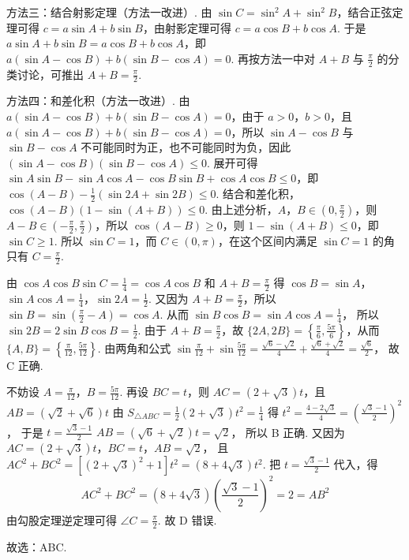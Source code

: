\begin{solution}
方法三：结合射影定理（方法一改进）. 由 \(\sin C = \sin^2 A + \sin^2 B\)，结合正弦定理可得 \(c = a \sin A + b \sin B\)，由射影定理可得 \(c = a \cos B + b \cos A\). 于是 \(a \sin A + b \sin B = a \cos B + b \cos A\)，即 \(a(\sin A - \cos B) + b(\sin B - \cos A) = 0\). 再按方法一中对 \(A+B\) 与 \(\frac{\pi}{2}\) 的分类讨论，可推出 \(A + B = \frac{\pi}{2}\).

方法四：和差化积（方法一改进）. 由 \(a(\sin A - \cos B) + b(\sin B - \cos A) = 0\)，由于 \(a>0\)，\(b>0\)，且 \(a(\sin A-\cos B)+b(\sin B-\cos A)=0\)，所以 \(\sin A-\cos B\) 与 \(\sin B-\cos A\) 不可能同时为正，也不可能同时为负，因此 \((\sin A - \cos B)(\sin B - \cos A) \le 0\). 展开可得 \(\sin A \sin B - \sin A \cos A - \cos B \sin B + \cos A \cos B \le 0\)，即 \(\cos (A - B) - \frac{1}{2}(\sin 2A + \sin 2B) \le 0\). 结合和差化积，\(\cos (A - B)(1 - \sin (A + B)) \le 0\). 由上述分析，\(A\)，\(B \in \left(0,\frac{\pi}{2}\right)\)，则 \(A - B \in (-\frac{\pi}{2},\frac{\pi}{2})\)，所以 \(\cos (A - B) \ge 0\)，则 \(1 - \sin (A + B) \le 0\)，即 \(\sin C \ge 1\). 所以 \(\sin C = 1\)，而 \(C\in(0,\pi)\)，在这个区间内满足 \(\sin C=1\) 的角只有 \(C=\frac{\pi}{2}\).

由
\(\cos A \cos B \sin C = \frac{1}{4} = \cos A \cos B\)
和
\(A + B = \frac{\pi}{2}\)
得
\(\cos B=\sin A\)，\(\sin A \cos A=\frac{1}{4}\)，\(\sin 2A=\frac{1}{2}\).
又因为 \(A+B=\frac{\pi}{2}\)，所以
\(\sin B=\sin\left(\frac{\pi}{2}-A\right)=\cos A\).
从而
\(\sin B\cos B=\sin A\cos A=\frac{1}{4}\)，
所以
\(\sin 2B=2\sin B\cos B=\frac{1}{2}\).
由于 \(A+B=\frac{\pi}{2}\)，故
\(\{2A,2B\}=\left\{\frac{\pi}{6},\frac{5\pi}{6}\right\}\)，从而
\(\{A,B\}=\left\{\frac{\pi}{12},\frac{5\pi}{12}\right\}\).
由两角和公式
\(
\sin \frac{\pi}{12} + \sin \frac{5\pi}{12} = \frac{\sqrt{6} - \sqrt{2}}{4} + \frac{\sqrt{6} + \sqrt{2}}{4} = \frac{\sqrt{6}}{2}
\)，
故 C 正确.

不妨设 \(A=\frac{\pi}{12}\)，\(B=\frac{5\pi}{12}\). 再设 \(BC = t\)，则 \(AC = (2 + \sqrt{3})t\)，且
\(AB = (\sqrt{2} + \sqrt{6})t\)
由
\(S_{\triangle ABC} = \frac{1}{2}(2 + \sqrt{3})t^2 = \frac{1}{4}\)
得
\(
t^2=\frac{4 - 2\sqrt{3}}{4}=\left(\frac{\sqrt{3} - 1}{2}\right)^2
\)，
于是
\(t = \frac{\sqrt{3} - 1}{2}\)
\(AB = (\sqrt{6} + \sqrt{2})t = \sqrt{2}\)，
所以 B 正确. 又因为
\(AC=(2+\sqrt{3})t\)，\(BC=t\)，\(AB=\sqrt{2}\)，
且
\(AC^2+BC^2=\left[(2+\sqrt{3})^2+1\right]t^2=(8+4\sqrt{3})t^2\).
把 \(t=\frac{\sqrt{3}-1}{2}\) 代入，得
\[
AC^2+BC^2=(8+4\sqrt{3})\left(\frac{\sqrt{3}-1}{2}\right)^2=2=AB^2
\]
由勾股定理逆定理可得
\(\angle C=\frac{\pi}{2}\).
故 D 错误.


故选：ABC.
\end{solution}
